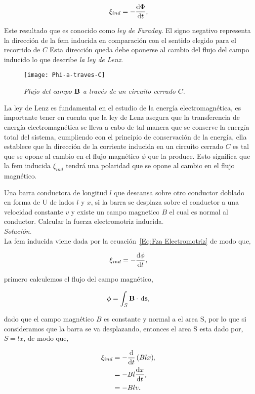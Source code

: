 \begin{equation}
	\label{Eq:LeyFaraday}
	\xi_{ind} = -\diff{\Phi}{t},
\end{equation}

Este resultado que es conocido como \emph{ley de Faraday}. El signo negativo representa la dirección de la fem inducida en comparación con el sentido elegido para el recorrido de $C$ Esta dirección queda debe oponerse al cambio del flujo del campo inducido lo que describe \emph{la ley de Lenz}.\\

\begin{figure}[h]
	\centering
	\texttt{[image: Phi-a-traves-C]}
	\caption{\emph{Flujo del campo $\textbf{B}$ a través de un circuito cerrado $C$.}}\label{Phi-a-traves-C}
\end{figure}

La ley de Lenz es fundamental en el estudio de la energía electromagnética, es importante tener en cuenta que la ley de Lenz asegura que la transferencia de energía electromagnética se lleva a cabo de tal manera que se conserve la energía total del sistema, cumpliendo con el principio de conservación de la energía, ella establece que la dirección de la corriente inducida en un circuito cerrado $C$ es tal que se opone al cambio en el flujo magnético $\phi$ que la produce. Esto significa que la fem inducida $\xi_{ind}$ tendrá una polaridad que se opone al cambio en el flujo magnético.

	\begin{example}
		Una barra conductora de longitud $l$ que descansa sobre otro conductor doblado en forma de U de lados $l$ y $x$, si la barra se desplaza sobre el conductor a una velocidad constante $v$ y existe un campo magnetico $B$ el cual es normal al conductor. Calcular la fuerza electromotriz inducida.\\
		\emph{\textit{ Solución.}}\\

		La fem inducida viene dada por la ecuación~\eqref{Eq:Fza Electromotriz} de modo que,

		\begin{equation*}
			\xi_{ind} = -\diff{\phi}{t},
		\end{equation*}

		primero calculemos el flujo del campo magnético,

		\begin{equation*}
			\phi = \int_{S} \B \cdot \dl{\textbf{s}},
		\end{equation*}

		dado que el campo magnético $B$ es constante y normal a el area S, por lo que si consideramos que la barra se va desplazando, entonces el area S esta dado por, $S = lx$, de modo que,

		\begin{align*}
			\xi_{ind} &= -\diff*{\left( Blx \right) }{t},\\
								&= -Bl \diff{x}{t},\\
								&= -Blv.
		\end{align*}
	\end{example}

